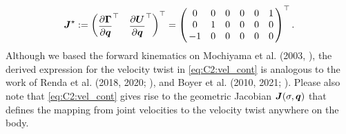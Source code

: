 %
\begin{align}
\renewcommand*{\arraystretch}{1}{}
\JB^\star := \begin{pmatrix}\dfrac{\p \GammaB}{\p \q}^\top & \dfrac{\p \UB}{\p \q}^\top \end{pmatrix}^\top  = \begin{pmatrix}
\,0 & 0 & 0 & 0 & 0 & 1 \, \\
\,0 & 1 & 0 & 0 & 0 & 0 \,  \\
\,-1 & 0 & 0 & 0 & 0 & 0 \,  \\
\end{pmatrix}^\top. \label{eq:C2:joint-axis-matrix}
\end{align}
%
Although we based the forward kinematics on Mochiyama et al. (2003, \cite{Mochiyama2003}), the derived expression for the velocity twist in \eqref{eq:C2:vel_cont} is analogous to the work of Renda et al. (2018, 2020; \cite{Renda2018,Renda2020}), and Boyer et al. (2010, 2021; \cite{Boyer2010,Boyer2021}). Please also note that
\eqref{eq:C2:vel_cont} gives rise to the geometric Jacobian ${\boldsymbol{J}}(\sigma,{\boldsymbol{q}})$ that defines the mapping from joint velocities to the velocity twist anywhere on the body.

